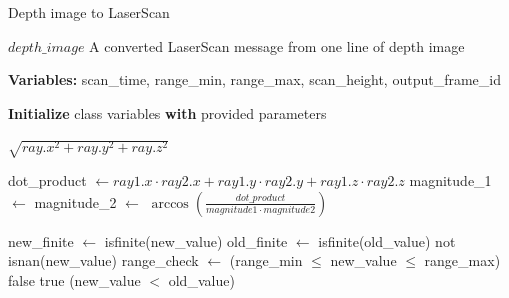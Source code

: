 \begin{algorithm}[H]
    \caption{Depth image to LaserScan}\label{alg:Dep2Laser}
    \begin{algorithmic}
    \Require $depth\_image$
    \Ensure A converted LaserScan message from one line of depth image

    \State \textbf{Variables:} scan\_time, range\_min, range\_max, scan\_height, output\_frame\_id
    
    \State \textbf{Initialize} class variables \textbf{with} provided parameters

        \State \Return $\sqrt{ray.x^2 + ray.y^2 + ray.z^2}$
    \EndFunction
    
        \State dot\_product $\gets ray1.x \cdot ray2.x + ray1.y \cdot ray2.y + ray1.z \cdot ray2.z$
        \State magnitude\_1 $\gets$ 
        \State magnitude\_2 $\gets$ 
        \State \Return $\arccos(\frac{dot\_product}{magnitude1 \cdot magnitude2})$
    \EndFunction
    
        \State new\_finite $\gets$ isfinite(new\_value)
        \State old\_finite $\gets$ isfinite(old\_value)
            \State \Return not isnan(new\_value)
        \EndIf
        \State range\_check $\gets$ (range\_min $\leq$ new\_value $\leq$ range\_max)
            \State \Return false
        \EndIf
            \State \Return true
        \EndIf
        \State \Return (new\_value $<$ old\_value)
    \EndFunction
    

    
    \end{algorithmic}
\end{algorithm}


